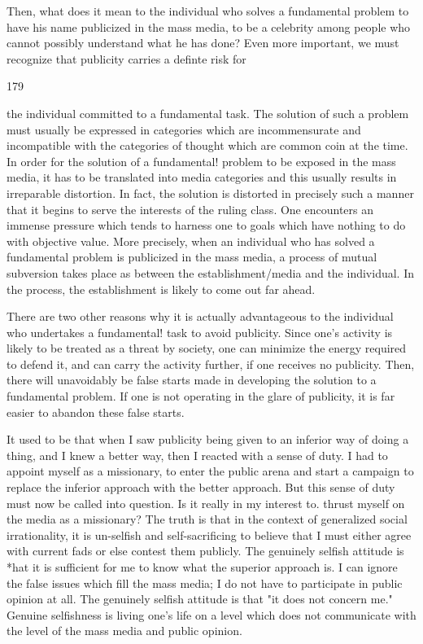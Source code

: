 \documentclass[10pt,twoside]{memoir}
\begin{document}
\begin{enumerate}
{\begin{enumerate}
\begin{sysrules}
\begin{sysrules}
\begin{sysrules}
\begin{sysrules}
{\begin{enumerate}
{{{{{{{Then, what does it mean to the individual who solves a fundamental 
problem to have his name publicized in the mass media, to be a celebrity 
among people who cannot possibly understand what he has done? Even 
more important, we must recognize that publicity carries a definte risk for 


179 


the individual committed to a fundamental task. The solution of such a 
problem must usually be expressed in categories which are incommensurate 
and incompatible with the categories of thought which are common coin at 
the time. In order for the solution of a fundamental! problem to be exposed 
in the mass media, it has to be translated into media categories and this 
usually results in irreparable distortion. In fact, the solution is distorted in 
precisely such a manner that it begins to serve the interests of the ruling 
class. One encounters an immense pressure which tends to harness one to 
goals which have nothing to do with objective value. More precisely, when an 
individual who has solved a fundamental problem is publicized in the mass 
media, a process of mutual subversion takes place as between the 
establishment/media and the individual. In the process, the establishment is 
likely to come out far ahead. 

There are two other reasons why it is actually advantageous to the 
individual who undertakes a fundamental! task to avoid publicity. Since one's 
activity is likely to be treated as a threat by society, one can minimize the 
energy required to defend it, and can carry the activity further, if one 
receives no publicity. Then, there will unavoidably be false starts made in 
developing the solution to a fundamental problem. If one is not operating in 
the glare of publicity, it is far easier to abandon these false starts. 

It used to be that when I saw publicity being given to an inferior way of 
doing a thing, and I knew a better way, then I reacted with a sense of duty. I 
had to appoint myself as a missionary, to enter the public arena and start a 
campaign to replace the inferior approach with the better approach. But this 
sense of duty must now be called into question. Is it really in my interest to. 
thrust myself on the media as a missionary? The truth is that in the context 
of generalized social irrationality, it is un-selfish and self-sacrificing to believe 
that I must either agree with current fads or else contest them publicly. The 
genuinely selfish attitude is *hat it is sufficient for me to know what the 
superior approach is. I can ignore the false issues which fill the mass media; I 
do not have to participate in public opinion at all. The genuinely selfish 
attitude is that "it does not concern me." Genuine selfishness is living one's 
life on a level which does not communicate with the level of the mass media 
and public opinion. 

}}}}}}}
\end{enumerate}}
\end{sysrules}
\end{sysrules}
\end{sysrules}
\end{sysrules}
\end{enumerate}}
\end{enumerate}
\end{document}
